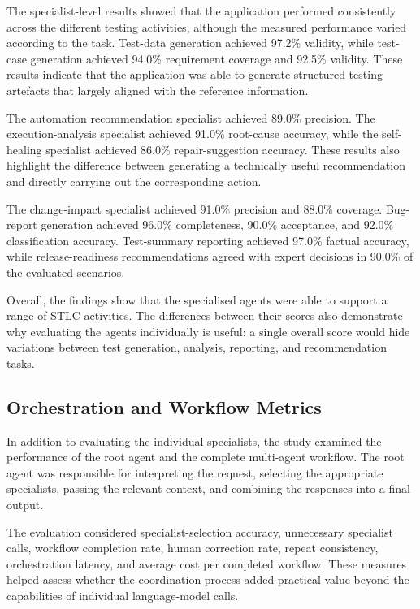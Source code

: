 The specialist-level results showed that the application performed consistently across the different testing activities, although the measured performance varied according to the task. Test-data generation achieved 97.2\% validity, while test-case generation achieved 94.0\% requirement coverage and 92.5\% validity. These results indicate that the application was able to generate structured testing artefacts that largely aligned with the reference information.

The automation recommendation specialist achieved 89.0\% precision. The execution-analysis specialist achieved 91.0\% root-cause accuracy, while the self-healing specialist achieved 86.0\% repair-suggestion accuracy. These results also highlight the difference between generating a technically useful recommendation and directly carrying out the corresponding action.

The change-impact specialist achieved 91.0\% precision and 88.0\% coverage. Bug-report generation achieved 96.0\% completeness, 90.0\% acceptance, and 92.0\% classification accuracy. Test-summary reporting achieved 97.0\% factual accuracy, while release-readiness recommendations agreed with expert decisions in 90.0\% of the evaluated scenarios.

Overall, the findings show that the specialised agents were able to support a range of STLC activities. The differences between their scores also demonstrate why evaluating the agents individually is useful: a single overall score would hide variations between test generation, analysis, reporting, and recommendation tasks.

\subsection{Orchestration and Workflow Metrics}
In addition to evaluating the individual specialists, the study examined the performance of the root agent and the complete multi-agent workflow. The root agent was responsible for interpreting the request, selecting the appropriate specialists, passing the relevant context, and combining the responses into a final output.

The evaluation considered specialist-selection accuracy, unnecessary specialist calls, workflow completion rate, human correction rate, repeat consistency, orchestration latency, and average cost per completed workflow. These measures helped assess whether the coordination process added practical value beyond the capabilities of individual language-model calls.

